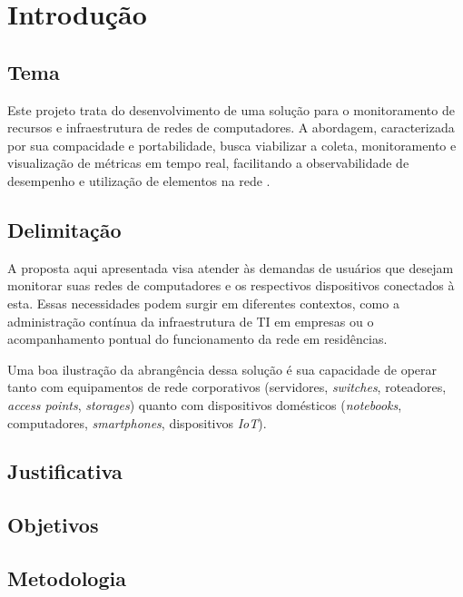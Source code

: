 \chapter{Introdução}

\section{Tema}

Este projeto trata do desenvolvimento de uma solução para o monitoramento de recursos e infraestrutura de redes de computadores.
A abordagem, caracterizada por sua compacidade e portabilidade, busca viabilizar a coleta, monitoramento e visualização de métricas em tempo real, facilitando a observabilidade de desempenho e utilização de elementos na rede .

\section{Delimitação}

A proposta aqui apresentada visa atender às demandas de usuários que desejam monitorar suas redes de computadores e os respectivos dispositivos conectados à esta. Essas necessidades podem surgir em diferentes contextos, como a administração contínua da infraestrutura de TI em empresas ou o acompanhamento pontual do funcionamento da rede em residências.

Uma boa ilustração da abrangência dessa solução é sua capacidade de operar tanto com equipamentos de rede corporativos (servidores, \textit{switches}, roteadores, \textit{access points}, \textit{storages}) quanto com dispositivos domésticos (\textit{notebooks}, computadores, \textit{smartphones}, dispositivos \textit{IoT}).


\section{Justificativa}
\section{Objetivos}
\section{Metodologia}
